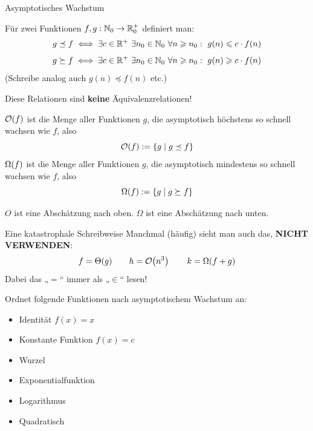 \begin{frame}{Asymptotisches Wachstum}
	\begin{Definition}
		Für zwei Funktionen $f,g: \mathbb{N}_0 \to \mathbb{R}_0^+$ definiert man:
		$$g \preceq f \Gdw \exists c \in \R^+ \ \exists n_0 \in \N_0 \ \forall n \geq n_0: \ g(n) \leq c \* f(n)$$
		$$g \succeq f \Gdw \exists c \in \R^+ \ \exists n_0 \in \N_0 \ \forall n \geq n_0: \ g(n) \geq c \* f(n)$$
		(Schreibe analog auch $g(n) \preceq f(n)$ etc.)
	\end{Definition} \pause
	Diese Relationen sind \textbf{keine} Äquivalenzrelationen!
\end{frame}

\begin{frame}[t]{} %
	\begin{Definition}
		$\mathcal{O}\!\left(f\right)$ ist die Menge aller Funktionen $g$, die asymptotisch höchstens so schnell wachsen wie $f$, also $$\mathcal{O}\!\left(f\right) := \{ g \mid g \preceq f \}$$
		$\Omega\!\left(f\right)$ ist die Menge aller Funktionen $g$, die asymptotisch mindestens so schnell wachsen wie $f$, also $$\Omega\!\left(f\right) := \{ g \mid g \succeq f \}$$
	\end{Definition} \pause
	\impl $O$ ist eine Abschätzung nach oben. $\Omega$ ist eine Abschätzung nach unten.
\end{frame}




\begin{frame}{Eine katastrophale Schreibweise}
	Manchmal (häufig) sieht man auch das, \textbf{NICHT VERWENDEN}:
	$$f = \Theta(g) \qquad h = \mathcal{O}\!\left(n^3\right) \qquad k = \Omega(f + g)$$
	\pause
	Dabei das „$=$“ immer als „$\in$“ lesen!
\end{frame}

\begin{frame}{}
	Ordnet folgende Funktionen nach asymptotischem Wachstum an:
	\begin{itemize}
		\item Identität $f(x) = x$
		\item Konstante Funktion $f(x) = c$
		\item Wurzel
		\item Exponentialfunktion
		\item Logarithmus
        \item Quadratisch
	\end{itemize}
\end{frame}

